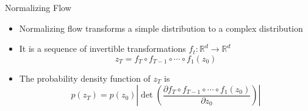 \documentclass{beamer}
\begin{document}
\begin{frame}{Normalizing Flow}
    \begin{itemize}
        \item Normalizing flow transforms a simple distribution to a complex distribution \cite{rezende15normalizingflows}
        \item It is a sequence of invertible transformations $f_t : \mathbb R^d \to \mathbb R^d$
        \begin{equation*}
            z_T = f_T \circ f_{T-1} \circ \cdots \circ f_1(z_0)
        \end{equation*}
        \item The probability density function of $z_T$ is
        \begin{equation*}
            p(z_T) = p(z_0) \left| \det \left( \frac{\partial f_T \circ f_{T-1} \circ \cdots \circ f_1(z_0)}{\partial z_0} \right) \right|
        \end{equation*}
    \end{itemize}
\end{frame}
\end{document}
